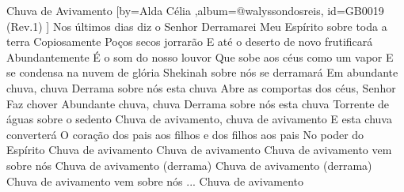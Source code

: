 \beginsong
{Chuva de Avivamento %
}[by={Alda Célia %
},album={@walyssondosreis},
id={GB0019 %
(Rev.1) %
}]
\beginverse
Nos últimos dias diz o Senhor
Derramarei Meu Espírito sobre toda a terra
Copiosamente
Poços secos jorrarão
E até o deserto de novo frutificará
Abundantemente
\endverse
\beginverse
É o som do nosso louvor
Que sobe aos céus como um vapor
E se condensa na nuvem de glória
Shekinah sobre nós se derramará
\endverse
\beginchorus
Em abundante chuva, chuva
Derrama sobre nós esta chuva
Abre as comportas dos céus, Senhor
Faz chover
Abundante chuva, chuva
Derrama sobre nós esta chuva
Torrente de águas sobre o sedento
Chuva de avivamento, chuva de avivamento
\endchorus
\beginverse
E esta chuva converterá
O coração dos pais aos filhos e dos filhos aos pais
No poder do Espírito
\endverse
{}
\beginverse*
Chuva de avivamento
Chuva de avivamento
Chuva de avivamento vem sobre nós
Chuva de avivamento (derrama)
Chuva de avivamento (derrama)
Chuva de avivamento vem sobre nós
\endverse
{}
\beginverse
... Chuva de avivamento
\endverse


